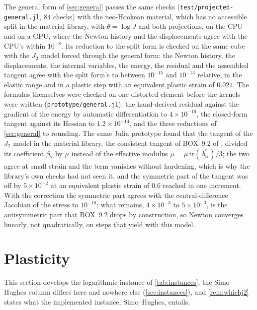 \documentclass{article}
\newcommand{\code}[1]{\texttt{#1}}
\theoremstyle{definition}
\theoremstyle{plain}
\begin{document}
The general form of \cref{sec:general} passes the same checks
(\code{test/projected-general.jl}, $84$ checks) with the neo-Hookean
material, which has no accessible split in the material library, with
$\theta = \log J$ and both projections, on the
CPU and on a GPU, where the Newton history and the displacements agree
with the CPU's within $10^{-8}$. Its reduction to the split form is checked
on the same cube with the $J_2$ model forced through the general form: the
Newton history, the displacements, the internal
variables, the energy, the residual and the assembled tangent agree with
the split form's to between $10^{-15}$ and $10^{-13}$ relative, in the
elastic range and in a plastic step with an equivalent plastic strain of
$0.021$. The formulas themselves were checked on one distorted element
before the kernels were written (\code{prototype/general.jl}): the
hand-derived residual against the gradient of the energy by automatic
differentiation to $4\times10^{-16}$, the closed-form tangent against its
Hessian to $1.2\times10^{-14}$, and the three reductions of
\cref{sec:general} to rounding. The same Julia prototype found that the
tangent of the $J_2$ model in the material library, the consistent tangent
of BOX~9.2 of \textcite{SimoHughes:1998}, divided its coefficient $\beta_2$ by
$\mu$ instead of the effective modulus $\bar\mu = \mu\,\mathrm{tr}(\bar{~b}^e_{\mathrm{tr}})/3$;
the two agree at small strain and the term vanishes without hardening, which
is why the library's own checks had not seen it, and the symmetric part of
the tangent was off by $5\times10^{-2}$ at an equivalent plastic strain of
$0.6$ reached in one increment. With the correction the symmetric part
agrees with the central-difference Jacobian of the stress to $10^{-10}$;
what remains, $4\times10^{-3}$ to $5\times10^{-3}$, is the antisymmetric part
that BOX~9.2 drops by construction, so Newton converges linearly, not
quadratically, on steps that yield with this model.

\section{Plasticity}
\label{sec:plasticity}

This section develops the logarithmic instance of \cref{tab:instances};
the Simo--Hughes column differs here and nowhere else (\cref{sec:instances}),
and \cref{rem:whichj2} states what the implemented instance,
Simo--Hughes, entails.
\end{document}
